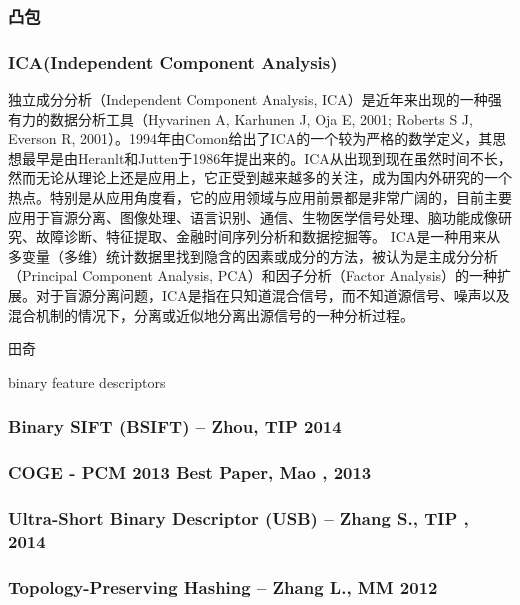 \documentclass[12pt]{article}
\begin{document}
\subsubsection{凸包}

\subsubsection{ICA(Independent Component Analysis)}

独立成分分析（Independent Component Analysis, ICA）是近年来出现的一种强有力的数据分析工具（Hyvarinen A, Karhunen J, Oja E, 2001; Roberts S J, Everson R, 2001）。1994年由Comon给出了ICA的一个较为严格的数学定义，其思想最早是由Heranlt和Jutten于1986年提出来的。ICA从出现到现在虽然时间不长，然而无论从理论上还是应用上，它正受到越来越多的关注，成为国内外研究的一个热点。特别是从应用角度看，它的应用领域与应用前景都是非常广阔的，目前主要应用于盲源分离、图像处理、语言识别、通信、生物医学信号处理、脑功能成像研究、故障诊断、特征提取、金融时间序列分析和数据挖掘等。
ICA是一种用来从多变量（多维）统计数据里找到隐含的因素或成分的方法，被认为是主成分分析（Principal Component Analysis, PCA）和因子分析（Factor Analysis）的一种扩展。对于盲源分离问题，ICA是指在只知道混合信号，而不知道源信号、噪声以及混合机制的情况下，分离或近似地分离出源信号的一种分析过程。





田奇

binary feature descriptors

\subsubsection{Binary SIFT (BSIFT) – Zhou, TIP 2014}

\subsubsection{COGE - PCM 2013 Best Paper, Mao , 2013}

\subsubsection{Ultra-Short Binary Descriptor (USB) – Zhang S., TIP , 2014}

\subsubsection{Topology-Preserving Hashing – Zhang L., MM 2012}
\end{document}
